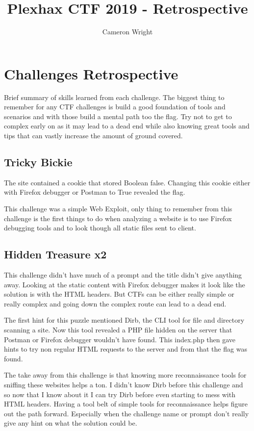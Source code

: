 \documentclass{article}
\begin{document}
\title{Plexhax CTF 2019 - Retrospective}
\author{Cameron Wright}

\maketitle

\section{Challenges Retrospective}

Brief summary of skills learned from each challenge.  The biggest thing to remember for any CTF challenges is build a good foundation of tools and scenarios and with those build a mental path too the flag.  Try not to get to complex early on as it may lead to a dead end while also knowing great tools and tips that can vastly increase the amount of ground covered.

\subsection{Tricky Bickie}

The site contained a cookie that stored Boolean false.  Changing this cookie either with Firefox debugger or Postman to True revealed the flag.

This challenge was a simple Web Exploit, only thing to remember from this challenge is the first things to do when analyzing a website is to use Firefox debugging tools and to look though all static files sent to client.

\subsection{Hidden Treasure x2}

This challenge didn't have much of a prompt and the title didn't give anything away.  Looking at the static content with Firefox debugger makes it look like the solution is with the HTML headers.  But CTFs can be either really simple or really complex and going down the complex route can lead to a dead end.

The first hint for this puzzle mentioned Dirb, the CLI tool for file and directory scanning a site.  Now this tool revealed a PHP file hidden on the server that Postman or Firefox debugger wouldn't have found.  This index.php then gave hints to try non regular HTML requests to the server and from that the flag was found.

The take away from this challenge is that knowing more reconnaissance tools for sniffing these websites helps a ton.  I didn't know Dirb before this challenge and so now that I know about it I can try Dirb before even starting to mess with HTML headers.  Having a tool belt of simple tools for reconnaissance helps figure out the path forward.  Especially when the challenge name or prompt don't really give any hint on what the solution could be.
\end{document}
